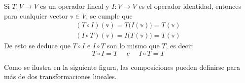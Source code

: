 \newpage

\begin{example}
    Si $T: V \longrightarrow V$ es un operador lineal y $I: V \longrightarrow V$ es el operador identidad, entonces para cualquier vector $\mathbb{v} \in V$, se cumple que
    \begin{align*}
        (T \circ I)(\mathbb{v}) = T\big(I(\mathbb{v})\big) = T(\mathbb{v}) \\
        (I \circ T)(\mathbb{v}) = I\big(T(\mathbb{v})\big) = T(\mathbb{v})
    \end{align*}
    De esto se deduce que $T \circ I$ e $I \circ T$ son lo mismo que $T$, es decir
    $$T \circ I = T \quad \text{ e } \quad I \circ T = T$$
\end{example}

Como se ilustra en la siguiente figura, las composiciones pueden definirse para más de dos transformaciones lineales.
